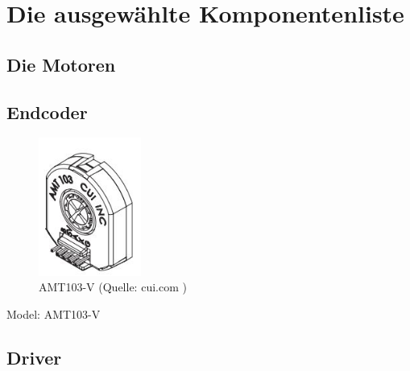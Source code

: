 \renewcommand{\autoren}{Valentyn Chepil}
\newpage
\section{Die ausgewählte Komponentenliste}
\subsection{Die Motoren}


\subsection{Endcoder}

\begin{figure}[!h]  %
	\centering\includegraphics[width=0.3\textwidth]{images/Entcoder.jpg}
	\caption{AMT103-V  \newline (Quelle: cui.com )}
	\label{Endcoder} %
\end{figure}

Model: AMT103-V

\subsection{Driver}


